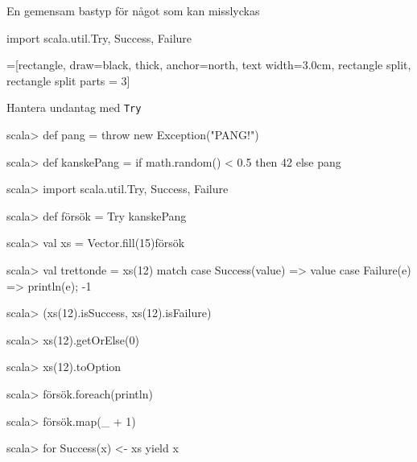 \begin{Slide}{En gemensam bastyp för något som kan misslyckas}\SlideFontSmall
\begin{Code}
import scala.util.{Try, Success, Failure}
\end{Code}
\ifkompendium\footnotesize\fi
\vspace{-0.5em}\begin{center}
\newcommand{\TextBox}[1]{\raisebox{0pt}[1em][0.5em]{#1}}
=[rectangle, draw=black,  thick, anchor=north, text width=3.0cm, rectangle split, rectangle split parts = 3]
\end{center}
\end{Slide}

\begin{Slide}{Hantera undantag med \texttt{Try}}
\vspace{-0.5em}\begin{REPLsmall}
scala> def pang = throw new Exception("PANG!")

scala> def kanskePang = if math.random() < 0.5 then 42 else pang

scala> import scala.util.{Try, Success, Failure}

scala> def försök = Try { kanskePang }

scala> val xs = Vector.fill(15){försök}

scala> val trettonde = xs(12) match
         case Success(value) => value
         case Failure(e) => println(e); -1

scala> (xs(12).isSuccess, xs(12).isFailure) 

scala> xs(12).getOrElse(0)

scala> xs(12).toOption

scala> försök.foreach(println)

scala> försök.map(_ + 1)

scala> for Success(x) <- xs yield x
\end{REPLsmall}
\end{Slide}

